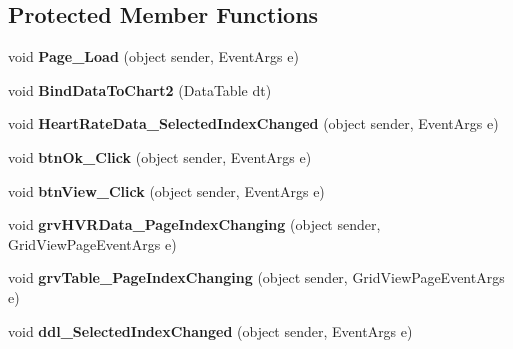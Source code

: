 \subsection*{Protected Member Functions}
\begin{DoxyCompactItemize}
\item 
\hypertarget{classusertrackothers__heartrate_a668c4e925ed4fe013741f7d3dda59ee4}{void {\bfseries Page\-\_\-\-Load} (object sender, Event\-Args e)}\label{classusertrackothers__heartrate_a668c4e925ed4fe013741f7d3dda59ee4}

\item 
\hypertarget{classusertrackothers__heartrate_a392526cfd4b52b4445030b32c0ab61b8}{void {\bfseries Bind\-Data\-To\-Chart2} (Data\-Table dt)}\label{classusertrackothers__heartrate_a392526cfd4b52b4445030b32c0ab61b8}

\item 
\hypertarget{classusertrackothers__heartrate_aaf20a30d96503fb8e0ac18f7656eafa1}{void {\bfseries Heart\-Rate\-Data\-\_\-\-Selected\-Index\-Changed} (object sender, Event\-Args e)}\label{classusertrackothers__heartrate_aaf20a30d96503fb8e0ac18f7656eafa1}

\item 
\hypertarget{classusertrackothers__heartrate_aee9bbb2a5c0f727e10dbf379ddd24524}{void {\bfseries btn\-Ok\-\_\-\-Click} (object sender, Event\-Args e)}\label{classusertrackothers__heartrate_aee9bbb2a5c0f727e10dbf379ddd24524}

\item 
\hypertarget{classusertrackothers__heartrate_a20c4853eab84ee04f643ec41760ca98d}{void {\bfseries btn\-View\-\_\-\-Click} (object sender, Event\-Args e)}\label{classusertrackothers__heartrate_a20c4853eab84ee04f643ec41760ca98d}

\item 
\hypertarget{classusertrackothers__heartrate_ad67a75c9cf3e9eaac50a2451a0924ff5}{void {\bfseries grv\-H\-V\-R\-Data\-\_\-\-Page\-Index\-Changing} (object sender, Grid\-View\-Page\-Event\-Args e)}\label{classusertrackothers__heartrate_ad67a75c9cf3e9eaac50a2451a0924ff5}

\item 
\hypertarget{classusertrackothers__heartrate_ae72e369f15201e24c9b3d9e1f96f0589}{void {\bfseries grv\-Table\-\_\-\-Page\-Index\-Changing} (object sender, Grid\-View\-Page\-Event\-Args e)}\label{classusertrackothers__heartrate_ae72e369f15201e24c9b3d9e1f96f0589}

\item 
\hypertarget{classusertrackothers__heartrate_acf19cac59a32b8a93cd093a5b915c4f4}{void {\bfseries ddl\-\_\-\-Selected\-Index\-Changed} (object sender, Event\-Args e)}\label{classusertrackothers__heartrate_acf19cac59a32b8a93cd093a5b915c4f4}


\end{DoxyCompactItemize}

